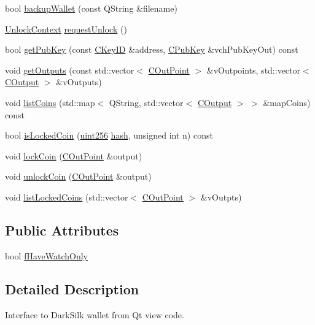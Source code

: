\begin{DoxyCompactItemize}
\item 
bool \hyperlink{class_wallet_model_aa316c19ef41f26ea89f194ab253d3206}{backup\+Wallet} (const Q\+String \&filename)
\item 
\hyperlink{class_wallet_model_1_1_unlock_context}{Unlock\+Context} \hyperlink{class_wallet_model_ae98eaede9493625ce778a0a873b3d124}{request\+Unlock} ()
\item 
bool \hyperlink{class_wallet_model_a25601217a489e196e947e47c2189c311}{get\+Pub\+Key} (const \hyperlink{class_c_key_i_d}{C\+Key\+I\+D} \&address, \hyperlink{class_c_pub_key}{C\+Pub\+Key} \&vch\+Pub\+Key\+Out) const 
\item 
void \hyperlink{class_wallet_model_a5237ea4d9724807a05e2944e5ce6f181}{get\+Outputs} (const std\+::vector$<$ \hyperlink{class_c_out_point}{C\+Out\+Point} $>$ \&v\+Outpoints, std\+::vector$<$ \hyperlink{class_c_output}{C\+Output} $>$ \&v\+Outputs)
\item 
void \hyperlink{class_wallet_model_aadf8de5a584594abdb299b463bd7578f}{list\+Coins} (std\+::map$<$ Q\+String, std\+::vector$<$ \hyperlink{class_c_output}{C\+Output} $>$ $>$ \&map\+Coins) const 
\item 
bool \hyperlink{class_wallet_model_a7712ac646004fe66c0bcafd0122c4ede}{is\+Locked\+Coin} (\hyperlink{classuint256}{uint256} \hyperlink{cache_8cc_a11ecb029164e055f28f4123ce3748862}{hash}, unsigned int n) const 
\item 
void \hyperlink{class_wallet_model_a9bb6c954dc3cf27e25ced65375fa02f0}{lock\+Coin} (\hyperlink{class_c_out_point}{C\+Out\+Point} \&output)
\item 
void \hyperlink{class_wallet_model_a0a5514bd400327df0f7d63341d8fabf4}{unlock\+Coin} (\hyperlink{class_c_out_point}{C\+Out\+Point} \&output)
\item 
void \hyperlink{class_wallet_model_a367977352d1ef183ec2cb6b508a85bc2}{list\+Locked\+Coins} (std\+::vector$<$ \hyperlink{class_c_out_point}{C\+Out\+Point} $>$ \&v\+Outpts)
\end{DoxyCompactItemize}
\subsection*{Public Attributes}
\begin{DoxyCompactItemize}
\item 
bool \hyperlink{class_wallet_model_ada7a868b3da256492ea1f19e28374495}{f\+Have\+Watch\+Only}
\end{DoxyCompactItemize}


\subsection{Detailed Description}
Interface to Dark\+Silk wallet from Qt view code. 

